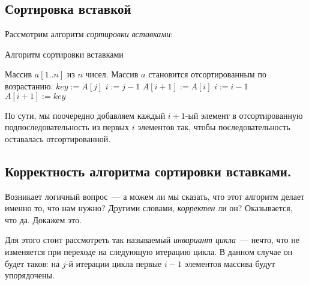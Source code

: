 \documentclass[a4paper,12pt]{article}
\begin{document}
\subsection{Сортировка вставкой} 
Рассмотрим алгоритм \emph{сортировки вставками}:

\begin{algorithm}[H]
	\caption{Алгоритм сортировки вставками}
	\label{algo:insertion-sort}
	\begin{algorithmic}[1]
		\Require Массив $a[1..n]$ из $n$ чисел. 
		\Ensure Массив $a$ становится отсортированным по возрастанию.
		\State $key \mathrel{:=} A[j]$
		\State $i \mathrel{:=} j - 1$
		\State $A[i + 1] \mathrel{:=} A[i]$
		\State $i \mathrel{:=} i - 1$
		\EndWhile
		\State $A[i + 1] \mathrel{:=} key$
		\EndFor
		\EndFunction
	\end{algorithmic}
\end{algorithm}

По сути, мы поочередно добавляем каждый $i + 1$-ый элемент в отсортированную подпоследовательность из первых $i$ элементов так, чтобы последовательность оставалась отсортированной.

\subsection{Корректность алгоритма сортировки вставками.}
Возникает логичный вопрос~--- а можем ли мы сказать, что этот алгоритм делает именно то, что нам нужно? Другими словами, \emph{корректен} ли он? Оказывается, что да. Докажем это.

Для этого стоит рассмотреть так называемый \emph{инвариант цикла}~--- нечто, что не изменяется при переходе на следующую итерацию цикла. В данном случае он будет таков: на $j$-й итерации цикла первые $i - 1$ элементов массива будут упорядочены.
\end{document}
